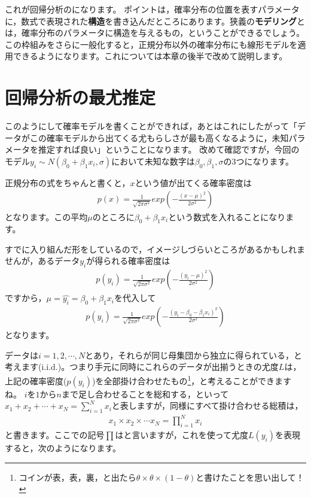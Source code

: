 \documentclass{ltjbook}
\begin{document}
これが回帰分析のになります。
ポイントは，確率分布の位置を表すパラメータに，数式で表現された\textbf{構造}を書き込んだところにあります。狭義の\textbf{モデリング}とは，確率分布のパラメータに構造を与えるもの，ということができるでしょう。
この枠組みをさらに一般化すると，正規分布以外の確率分布にも線形モデルを適用できるようになります。これについては本章の後半で改めて説明します。

\section{回帰分析の最尤推定}

このようにして確率モデルを書くことができれば，あとはこれにしたがって「データがこの確率モデルから出てくる尤もらしさが最も高くなるように，未知パラメータを推定すれば良い」ということになります。
改めて確認ですが，今回のモデル$y_i \sim N(\beta_0 + \beta_1x_i, \sigma)$において未知な数字は$\beta_0,\beta_1,\sigma$の3つになります。


正規分布の式をちゃんと書くと，$x$という値が出てくる確率密度は
\begin{align}
p(x) = \frac{1}{\sqrt{2\pi \sigma^2}}exp\left( - \frac{(x-\mu)^2}{2\sigma^2}\right)
\end{align}
となります。この平均$\mu$のところに$\beta_0 + \beta_1 x_i$という数式を入れることになります。

すでに入り組んだ形をしているので，イメージしづらいところがあるかもしれませんが，あるデータ$y_i$が得られる確率密度は
\begin{align}
p(y_i) = \frac{1}{\sqrt{2\pi \sigma^2}}exp\left( -\frac{(y_i-\mu)^2}{2\sigma^2}\right)
\end{align}
ですから，$\mu=\hat{y_i} = \beta_0 + \beta_1 x_i$を代入して
\begin{align}
p(y_i) = \frac{1}{\sqrt{2\pi \sigma^2}}exp\left( -\frac{(y_i-\beta_0 - \beta_1 x_i)^2}{2\sigma^2}\right)
\end{align}
となります。

データは$i = 1,2,\cdots,N$とあり，それらが同じ母集団から独立に得られている，と考えます(i.i.d.)。つまり手元に同時にこれらのデータが出揃うときの尤度$L$は，上記の確率密度($p(y_i)$)を全部掛け合わせたもの\footnote{コインが表，表，裏，と出たら$\theta \times \theta \times (1-\theta)$と書けたことを思い出して！}，と考えることができますね。
$i$を$1$から$n$まで足し合わせることを総和する，といって$x_1+x_2+\cdots+x_N=\sum_{i=1}^N x_i$と表しますが，同様にすべて掛け合わせる総積は，
\begin{align}
x_1 \times x_2 \times \cdots x_N = \prod_{i=1}^N x_i
\end{align}
と書きます。ここでの記号$\prod$はと言いますが，これを使って尤度$L(y_i)$を表現すると，次のようになります。
\end{document}
